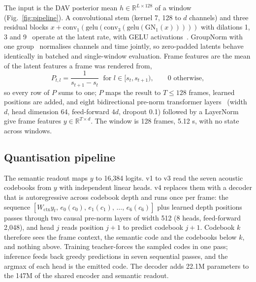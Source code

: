 The input is the DAV posterior mean $h \in \mathbb{R}^{L \times 128}$ of a window (Fig.~\ref{fig:pipeline}). A convolutional stem (kernel 7, 128 to $d$ channels) and three residual blocks $x + \mathrm{conv}_1(\mathrm{gelu}(\mathrm{conv}_3(\mathrm{gelu}(\mathrm{GN}_1(x)))))$ with dilations 1, 3 and 9~\cite{yu2016dilated} operate at the latent rate, with GELU activations~\cite{hendrycks2016gelu}. GroupNorm with one group~\cite{wu2018groupnorm} normalises channels and time jointly, so zero-padded latents behave identically in batched and single-window evaluation. Frame features are the mean of the latent features a frame was rendered from,
\begin{equation}
  P_{t,l} = \frac{1}{s_{t+1} - s_t} \;\text{ for } l \in [s_t, s_{t+1}),\qquad 0 \text{ otherwise},
  \label{eq:pool}
\end{equation}
so every row of $P$ sums to one; $P$ maps the result to $T \le 128$ frames, learned positions are added, and eight bidirectional pre-norm transformer layers~\cite{vaswani2017attention,xiong2020prenorm} (width $d$, head dimension 64, feed-forward $4d$, dropout 0.1) followed by a LayerNorm~\cite{ba2016layernorm} give frame features $y \in \mathbb{R}^{T \times d}$. The window is 128 frames, 5.12 s, with no state across windows.

\subsection{Quantisation pipeline}
\label{sec:depth}

The semantic readout maps $y$ to 16,384 logits. v1 to v3 read the seven acoustic codebooks from $y$ with independent linear heads. v4 replaces them with a decoder that is autoregressive across codebook depth and runs once per frame: the sequence $[W_{\mathrm{ctx}} y_t,\, e_0(c_0),\, e_1(c_1),\, \dots,\, e_6(c_6)]$ plus learned depth positions passes through two causal pre-norm layers of width 512 (8 heads, feed-forward 2,048), and head $j$ reads position $j+1$ to predict codebook $j+1$. Codebook $k$ therefore sees the frame context, the semantic code and the codebooks below $k$, and nothing above. Training teacher-forces the sampled codes in one pass; inference feeds back greedy predictions in seven sequential passes, and the argmax of each head is the emitted code. The decoder adds 22.1M parameters to the 147M of the shared encoder and semantic readout.

